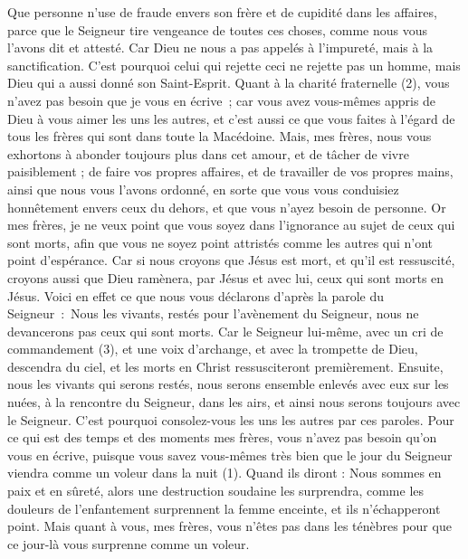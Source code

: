 \begin{multicols}{2}
Que personne n’use de fraude envers son frère et de cupidité dans les affaires, parce que le Seigneur tire vengeance de toutes ces choses, comme nous vous l’avons dit et attesté.
Car Dieu ne nous a pas appelés à l’impureté, mais à la sanctification.
C'est pourquoi celui qui rejette ceci ne rejette pas un homme, mais Dieu qui a aussi donné son Saint-Esprit.
Quant à la charité fraternelle (2), vous n'avez pas besoin que je vous en écrive ; car vous avez vous-mêmes appris de Dieu à vous aimer les uns les autres,
et c'est aussi ce que vous faites à l'égard de tous les frères qui sont dans toute la Macédoine. Mais, mes frères, nous vous exhortons à abonder toujours plus dans cet amour,
et de tâcher de vivre paisiblement ; de faire vos propres affaires, et de travailler de vos propres mains, ainsi que nous vous l'avons ordonné,
en sorte que vous vous conduisiez honnêtement envers ceux du dehors, et que vous n'ayez besoin de personne.
Or mes frères, je ne veux point que vous soyez dans l’ignorance au sujet de ceux qui sont morts, afin que vous ne soyez point attristés comme les autres qui n'ont point d'espérance.
Car si nous croyons que Jésus est mort, et qu'il est ressuscité, croyons aussi que Dieu ramènera, par Jésus et avec lui, ceux qui sont morts en Jésus.
Voici en effet ce que nous vous déclarons d’après la parole du Seigneur : Nous les vivants, restés pour l’avènement du Seigneur, nous ne devancerons pas ceux qui sont morts.
Car le Seigneur lui-même, avec un cri de commandement (3), et une voix d'archange, et avec la trompette de Dieu, descendra du ciel, et les morts en Christ ressusciteront premièrement.
Ensuite, nous les vivants qui serons restés, nous serons ensemble enlevés avec eux sur les nuées, à la rencontre du Seigneur, dans les airs, et ainsi nous serons toujours avec le Seigneur.
C'est pourquoi consolez-vous les uns les autres par ces paroles.
\VerseOne{}Pour ce qui est des temps et des moments mes frères, vous n'avez pas besoin qu'on vous en écrive,
puisque vous savez vous-mêmes très bien que le jour du Seigneur viendra comme un voleur dans la nuit (1).
Quand ils diront : Nous sommes en paix et en sûreté, alors une destruction soudaine les surprendra, comme les douleurs de l’enfantement surprennent la femme enceinte, et ils n’échapperont point.
Mais quant à vous, mes frères, vous n'êtes pas dans les ténèbres pour que ce jour-là vous surprenne comme un voleur.

\end{multicols}
